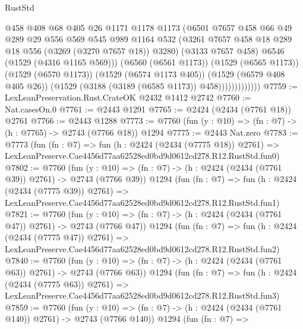 \begin{lexlean}{RustStd}
\begin{coremodule}
                          @458
                          @408
                          @68
                          @405
                          @26
                          @1171
                          @1178
                          @1173
                          (@6501
                            @7657
                            @458
                            @66
                            @49
                            @289
                            @29
                            @556
                            @569
                            @545
                            @989
                            @1164
                            @532
                            (@3261 @7657 @458 @18 @289 @18 @556 (@3269 (@3270 @7657 @18)) @3280)
                            (@3133 @7657 @458)
                            @6546
                            (@1529 (@4316 @1165 @569)))
                          (@6560 (@6561 @1173))
                          (@1529 (@6565 @1173))
                          (@1529 (@6570 @1173))
                          (@1529 (@6574 @1173 @405))
                          (@1529 (@6579 @408 @405 @26))
                          (@1529 (@3188 (@3189 (@6585 @1173)) @458)))))))))))))
@7759 := LexLeanPreservation.Rust.CrateOK @2432 @1412 @2742
@7760 := Nat.casesOn.{0}
@7761 := @2443 @1291
@7765 := @2424 (@2434 (@7761 @18)) @2761
@7766 := @2443 @1288
@7773 := @7760 (fun (y : @10) => (fn : @7) -> (h : @7765) -> @2743 (@7766 @18)) @1294
@7775 := @2443 Nat.zero
@7783 := @7773
    (fun (fn : @7) =>
    fun (h : @2424 (@2434 (@7775 @18)) @2761) =>
    LexLeanPreserve.Cae4456d77aa62528ed0bd9d0612cd278.R12.RustStd.fun0)
@7802 := @7760
    (fun (y : @10) => (fn : @7) -> (h : @2424 (@2434 (@7761 @39)) @2761) -> @2743 (@7766 @39))
    @1294
    (fun (fn : @7) =>
    fun (h : @2424 (@2434 (@7775 @39)) @2761) =>
    LexLeanPreserve.Cae4456d77aa62528ed0bd9d0612cd278.R12.RustStd.fun1)
@7821 := @7760
    (fun (y : @10) => (fn : @7) -> (h : @2424 (@2434 (@7761 @47)) @2761) -> @2743 (@7766 @47))
    @1294
    (fun (fn : @7) =>
    fun (h : @2424 (@2434 (@7775 @47)) @2761) =>
    LexLeanPreserve.Cae4456d77aa62528ed0bd9d0612cd278.R12.RustStd.fun2)
@7840 := @7760
    (fun (y : @10) => (fn : @7) -> (h : @2424 (@2434 (@7761 @63)) @2761) -> @2743 (@7766 @63))
    @1294
    (fun (fn : @7) =>
    fun (h : @2424 (@2434 (@7775 @63)) @2761) =>
    LexLeanPreserve.Cae4456d77aa62528ed0bd9d0612cd278.R12.RustStd.fun3)
@7859 := @7760
    (fun (y : @10) => (fn : @7) -> (h : @2424 (@2434 (@7761 @140)) @2761) -> @2743 (@7766 @140))
    @1294
    (fun (fn : @7) =>

\end{coremodule}
\end{lexlean}
